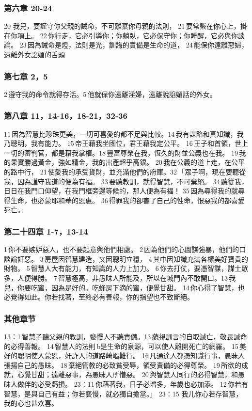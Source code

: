 \subsubsection{第六章 20-24} 
20 我兒，要謹守你父親的誡命，不可離棄你母親的法則， 21 要常繫在你心上，掛在你項上。 22 你行走，它必引導你；你躺臥，它必保守你；你睡醒，它必與你談論。 23 因為誡命是燈，法則是光，訓誨的責備是生命的道， 24 能保你遠離惡婦，遠離外女諂媚的舌頭
\subsubsection{第七章 2，5}  
2 遵守我的命令就得存活。5 他就保你遠離淫婦，遠離說諂媚話的外女。
\subsubsection{第八章 11，14-16，18-21，32-36}   
11 因為智慧比珍珠更美，一切可喜愛的都不足與比較。14 我有謀略和真知識，我乃聰明，我有能力。 15 帝王藉我坐國位，君王藉我定公平。 16 王子和首領，世上一切的審判官，都是藉我掌權。18 豐富尊榮在我，恆久的財並公義也在我。 19 我的果實勝過黃金，強如精金，我的出產超乎高銀。 20 我在公義的道上走，在公平的路中行， 21 使愛我的承受貨財，並充滿他們的府庫。32 「眾子啊，現在要聽從我，因為謹守我道的便為有福。 33 要聽教訓，就得智慧，不可棄絕。 34 聽從我，日日在我門口仰望，在我門框旁邊等候的，那人便為有福！ 35 因為尋得我的就尋得生命，也必蒙耶和華的恩惠。 36 得罪我的卻害了自己的性命，恨惡我的都喜愛死亡。」
 
\subsubsection{第二十四章 1-7，13-14} 
1 你不要嫉妒惡人，也不要起意與他們相處。 2 因為他們的心圖謀強暴，他們的口談論奸惡。 3 房屋因智慧建造，又因聰明立穩， 4 其中因知識充滿各樣美好寶貴的財物。 5 智慧人大有能力，有知識的人力上加力。 6 你去打仗，要憑智謀，謀士眾多，人便得勝。 7 智慧極高，非愚昧人所能及，所以在城門內不敢開口。13 我兒，你要吃蜜，因為是好的。吃蜂房下滴的蜜，便覺甘甜。 14 你心得了智慧，也必覺得如此。你若找著，至終必有善報，你的指望也不致斷絕。

\subsubsection{其他章节} 
13：1 智慧子聽父親的教訓，褻慢人不聽責備。13 藐視訓言的自取滅亡，敬畏誡命的必得善報。 14 智慧人的法則 b是生命的泉源，可以使人離開死亡的網羅。 15 美好的聰明使人蒙恩，奸詐人的道路崎嶇難行。 16 凡通達人都憑知識行事，愚昧人張揚自己的愚昧。 18 棄絕管教的必致貧受辱，領受責備的必得尊榮。 19 所欲的成就，心覺甘甜；遠離惡事，為愚昧人所憎惡。 20 與智慧人同行的必得智慧，和愚昧人做伴的必受虧損。
23：11 你藉著我，日子必增多，年歲也必加添。 12 你若有智慧，是與自己有益；你若褻慢，就必獨自擔當。」 
23：15 我儿你心若存智慧，我的心也甚欢喜。
  
